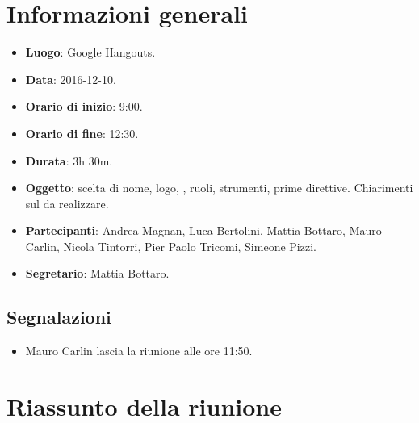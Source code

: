\documentclass[a4paper,titlepage]{article}
\begin{document}
\maketitle
\begin{diario}
\end{diario}
\newpage
\tableofcontents

\newpage
\section{Informazioni generali}
\label{sec:Informazioni}

\begin{itemize}
  \item \textbf{Luogo}: Google Hangouts.
  \item \textbf{Data}: 2016-12-10.
  \item \textbf{Orario di inizio}: 9:00.
  \item \textbf{Orario di fine}: 12:30.
  \item \textbf{Durata}: 3h 30m.
  \item \textbf{Oggetto}: scelta di nome, logo, , ruoli, strumenti, prime direttive. Chiarimenti sul  da realizzare. 
  \item \textbf{Partecipanti}: Andrea Magnan, Luca Bertolini, Mattia Bottaro, Mauro Carlin, Nicola Tintorri, Pier Paolo Tricomi, Simeone Pizzi.
  \item \textbf{Segretario}: Mattia Bottaro.
  
\end{itemize}
\subsection{Segnalazioni}
\begin{itemize}
 \item Mauro Carlin lascia la riunione alle ore 11:50.
\end{itemize}
\section{Riassunto della riunione}
\label{sec:RiassuntoRiunione}
\end{document}
